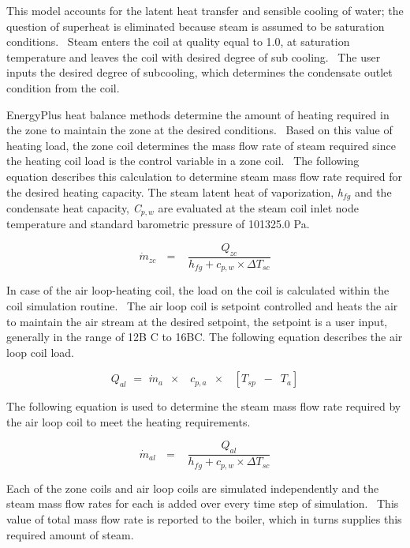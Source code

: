 This model accounts for the latent heat transfer and sensible cooling of water; the question of superheat is eliminated because steam is assumed to be saturation conditions.~ Steam enters the coil at quality equal to 1.0, at saturation temperature and leaves the coil with desired degree of sub cooling.~ The user inputs the desired degree of subcooling, which determines the condensate outlet condition from the coil.

EnergyPlus heat balance methods determine the amount of heating required in the zone to maintain the zone at the desired conditions.~ Based on this value of heating load, the zone coil determines the mass flow rate of steam required since the heating coil load is the control variable in a zone coil.~ The following equation describes this calculation to determine steam mass flow rate required for the desired heating capacity. The steam latent heat of vaporization, \emph{h}\(_{fg}\) and the condensate heat capacity, \emph{C}\(_{p,w}\) are evaluated at the steam coil inlet node temperature and standard barometric pressure of 101325.0 Pa.

\begin{equation}
{\dot m_{zc}}\,\,\,\, = \,\,\,\,\,\frac{{{Q_{zc}}}}{{{h_{fg}} + {c_{p,w}} \times \Delta {T_{sc}}}}
\end{equation}

In case of the air loop-heating coil, the load on the coil is calculated within the coil simulation routine.~ The air loop coil is setpoint controlled and heats the air to maintain the air stream at the desired setpoint, the setpoint is a user input, generally in the range of 12B C to 16BC. The following equation describes the air loop coil load.

\begin{equation}
{Q_{al}}\,\, = \,\,{\dot m_a}\,\,\, \times \,\,\,\,\,{c_{p,a}}\,\,\, \times \,\,\,\,\,\left[ {{T_{sp}}\,\,\, - \,\,\,{T_a}} \right]
\end{equation}

The following equation is used to determine the steam mass flow rate required by the air loop coil to meet the heating requirements.

\begin{equation}
{\dot m_{al}}\,\,\,\, = \,\,\,\,\,\frac{{{Q_{al}}}}{{{h_{fg}} + {c_{p,w}} \times \Delta {T_{sc}}}}
\end{equation}

Each of the zone coils and air loop coils are simulated independently and the steam mass flow rates for each is added over every time step of simulation.~ This value of total mass flow rate is reported to the boiler, which in turns supplies this required amount of steam.

